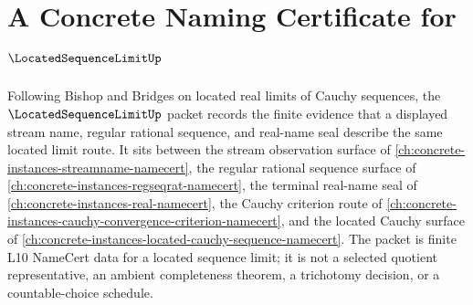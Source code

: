 \chapter{A Concrete Naming Certificate for $\LocatedSequenceLimitUp$}
\label{ch:concrete-instances-located-sequence-limit-namecert}

Following Bishop and Bridges on located real limits of Cauchy sequences, the $\LocatedSequenceLimitUp$ packet records the finite evidence that a displayed stream name, regular rational sequence, and real-name seal describe the same located limit route. It sits between the stream observation surface of \autoref{ch:concrete-instances-streamname-namecert}, the regular rational sequence surface of \autoref{ch:concrete-instances-regseqrat-namecert}, the terminal real-name seal of \autoref{ch:concrete-instances-real-namecert}, the Cauchy criterion route of \autoref{ch:concrete-instances-cauchy-convergence-criterion-namecert}, and the located Cauchy surface of \autoref{ch:concrete-instances-located-cauchy-sequence-namecert}. The packet is finite L10 NameCert data for a located sequence limit; it is not a selected quotient representative, an ambient completeness theorem, a trichotomy decision, or a countable-choice schedule.

